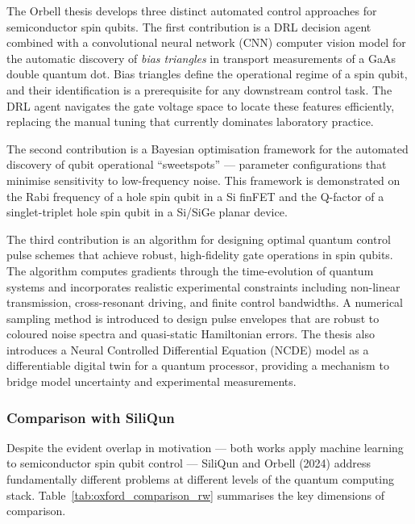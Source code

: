 The Orbell thesis develops three distinct automated control approaches for
semiconductor spin qubits. The first contribution is a DRL decision agent
combined with a convolutional neural network (CNN) computer vision model
for the automatic discovery of \emph{bias triangles} in transport
measurements of a GaAs double quantum dot. Bias triangles define the
operational regime of a spin qubit, and their identification is a
prerequisite for any downstream control task. The DRL agent navigates the
gate voltage space to locate these features efficiently, replacing the
manual tuning that currently dominates laboratory practice.

The second contribution is a Bayesian optimisation framework for the
automated discovery of qubit operational ``sweetspots'' — parameter
configurations that minimise sensitivity to low-frequency noise. This
framework is demonstrated on the Rabi frequency of a hole spin qubit in a
Si finFET and the Q-factor of a singlet-triplet hole spin qubit in a
Si/SiGe planar device.

The third contribution is an algorithm for designing optimal quantum control
pulse schemes that achieve robust, high-fidelity gate operations in spin
qubits. The algorithm computes gradients through the time-evolution of
quantum systems and incorporates realistic experimental constraints
including non-linear transmission, cross-resonant driving, and finite
control bandwidths. A numerical sampling method is introduced to design
pulse envelopes that are robust to coloured noise spectra and quasi-static
Hamiltonian errors. The thesis also introduces a Neural Controlled
Differential Equation (NCDE) model as a differentiable digital twin for a
quantum processor, providing a mechanism to bridge model uncertainty and
experimental measurements.

\subsubsection{Comparison with SiliQun}

Despite the evident overlap in motivation — both works apply machine
learning to semiconductor spin qubit control — SiliQun and Orbell (2024)
address fundamentally different problems at different levels of the quantum
computing stack. Table~\ref{tab:oxford_comparison_rw} summarises the key
dimensions of comparison.

